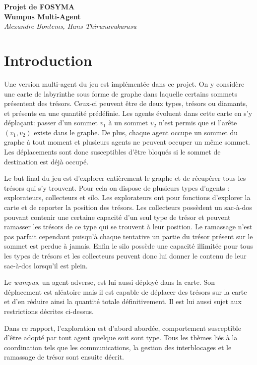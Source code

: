 \documentclass[11pt]{article}
\begin{document}
	
\begin{center}
	\textbf{Projet de FOSYMA\\[.5cm]Wumpus Multi-Agent}\\[.5cm]
	\textit{Alexandre Bontems, Hans Thirunavukarasu}\\
\end{center}

\tableofcontents
\section{Introduction}
Une version multi-agent du jeu  est implémentée dans ce projet. On y considère une carte de labyrinthe sous forme de graphe dans laquelle certains sommets présentent des trésors. Ceux-ci peuvent être de deux types, trésors ou diamants, et présents en une quantité prédéfinie. Les agents évoluent dans cette carte en s'y déplaçant: passer d'un sommet $v_1$ à un sommet $v_2$ n'est permis que si l'arête $(v_1, v_2)$ existe dans le graphe. De plus, chaque agent occupe un sommet du graphe à tout moment et plusieurs agents ne peuvent occuper un même sommet. Les déplacements sont donc susceptibles d'être bloqués si le sommet de destination est déjà occupé.

Le but final du jeu est d'explorer entièrement le graphe et de récupérer tous les trésors qui s'y trouvent. Pour cela on dispose de plusieurs types d'agents : explorateurs, collecteurs et silo. Les explorateurs ont pour fonctions d'explorer la carte et de reporter la position des trésors. Les collecteurs possèdent un sac-à-dos pouvant contenir une certaine capacité d'un seul type de trésor et peuvent ramasser les trésors de ce type qui se trouvent à leur position. Le ramassage n'est pas parfait cependant puisqu'à chaque tentative un partie du trésor présent sur le sommet est perdue à jamais. Enfin le silo possède une capacité illimitée pour tous les types de trésors et les collecteurs peuvent donc lui donner le contenu de leur sac-à-dos lorsqu'il est plein.

Le \textit{wumpus}, un agent adverse, est lui aussi déployé dans la carte. Son déplacement est aléatoire mais il est capable de déplacer des trésors sur la carte et d'en réduire ainsi la quantité totale définitivement. Il est lui aussi sujet aux restrictions décrites ci-dessus.

Dans ce rapport, l'exploration est d'abord abordée, comportement susceptible d'être adopté par tout agent quelque soit sont type. Tous les thèmes liés à la coordination tels que les communications, la gestion des interblocages et le ramassage de trésor sont ensuite décrit.
\end{document}
